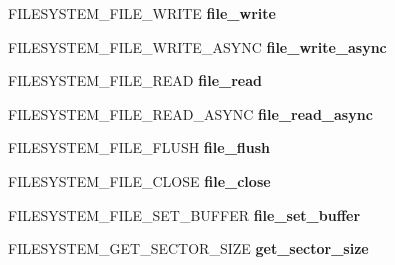 \begin{DoxyCompactItemize}
\item 
\hypertarget{struct_f_i_l_e_s_y_s_t_e_m_a23254ee1a6b64a63160c4ae6bc6197d8}{F\-I\-L\-E\-S\-Y\-S\-T\-E\-M\-\_\-\-F\-I\-L\-E\-\_\-\-W\-R\-I\-T\-E {\bfseries file\-\_\-write}}\label{struct_f_i_l_e_s_y_s_t_e_m_a23254ee1a6b64a63160c4ae6bc6197d8}

\item 
\hypertarget{struct_f_i_l_e_s_y_s_t_e_m_a29f27c06d80d68773159e36c069d8742}{F\-I\-L\-E\-S\-Y\-S\-T\-E\-M\-\_\-\-F\-I\-L\-E\-\_\-\-W\-R\-I\-T\-E\-\_\-\-A\-S\-Y\-N\-C {\bfseries file\-\_\-write\-\_\-async}}\label{struct_f_i_l_e_s_y_s_t_e_m_a29f27c06d80d68773159e36c069d8742}

\item 
\hypertarget{struct_f_i_l_e_s_y_s_t_e_m_acf3864c0ef7fe3ba25bcdda84c929802}{F\-I\-L\-E\-S\-Y\-S\-T\-E\-M\-\_\-\-F\-I\-L\-E\-\_\-\-R\-E\-A\-D {\bfseries file\-\_\-read}}\label{struct_f_i_l_e_s_y_s_t_e_m_acf3864c0ef7fe3ba25bcdda84c929802}

\item 
\hypertarget{struct_f_i_l_e_s_y_s_t_e_m_a0a4208965ca8863eac63646c57f0b1a4}{F\-I\-L\-E\-S\-Y\-S\-T\-E\-M\-\_\-\-F\-I\-L\-E\-\_\-\-R\-E\-A\-D\-\_\-\-A\-S\-Y\-N\-C {\bfseries file\-\_\-read\-\_\-async}}\label{struct_f_i_l_e_s_y_s_t_e_m_a0a4208965ca8863eac63646c57f0b1a4}

\item 
\hypertarget{struct_f_i_l_e_s_y_s_t_e_m_a424a29b70b009aa4e8e27ff53cb6004f}{F\-I\-L\-E\-S\-Y\-S\-T\-E\-M\-\_\-\-F\-I\-L\-E\-\_\-\-F\-L\-U\-S\-H {\bfseries file\-\_\-flush}}\label{struct_f_i_l_e_s_y_s_t_e_m_a424a29b70b009aa4e8e27ff53cb6004f}

\item 
\hypertarget{struct_f_i_l_e_s_y_s_t_e_m_a55ae857947bdbdec00ceb9b852b91e17}{F\-I\-L\-E\-S\-Y\-S\-T\-E\-M\-\_\-\-F\-I\-L\-E\-\_\-\-C\-L\-O\-S\-E {\bfseries file\-\_\-close}}\label{struct_f_i_l_e_s_y_s_t_e_m_a55ae857947bdbdec00ceb9b852b91e17}

\item 
\hypertarget{struct_f_i_l_e_s_y_s_t_e_m_a1b35ce5548e86f5b0555444a96dbe8a2}{F\-I\-L\-E\-S\-Y\-S\-T\-E\-M\-\_\-\-F\-I\-L\-E\-\_\-\-S\-E\-T\-\_\-\-B\-U\-F\-F\-E\-R {\bfseries file\-\_\-set\-\_\-buffer}}\label{struct_f_i_l_e_s_y_s_t_e_m_a1b35ce5548e86f5b0555444a96dbe8a2}

\item 
\hypertarget{struct_f_i_l_e_s_y_s_t_e_m_a6d5d1178879fdf249a6b21a65c6ec7c5}{F\-I\-L\-E\-S\-Y\-S\-T\-E\-M\-\_\-\-G\-E\-T\-\_\-\-S\-E\-C\-T\-O\-R\-\_\-\-S\-I\-Z\-E {\bfseries get\-\_\-sector\-\_\-size}}\label{struct_f_i_l_e_s_y_s_t_e_m_a6d5d1178879fdf249a6b21a65c6ec7c5}


\end{DoxyCompactItemize}
